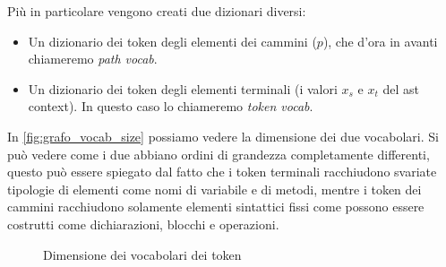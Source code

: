 Più in particolare vengono creati due dizionari diversi:
  \begin{itemize}
    \item Un dizionario dei token degli elementi dei cammini ($p$), che d'ora in avanti chiameremo \textit{path vocab}.
    \item Un dizionario dei token degli elementi terminali (i valori $x_s$ e $x_t$ del ast context). In questo caso lo chiameremo \textit{token vocab}.
  \end{itemize}
In \autoref{fig:grafo_vocab_size} possiamo vedere la dimensione dei due vocabolari.
Si può vedere come i due abbiano ordini di grandezza completamente differenti, questo può essere spiegato dal fatto che i token terminali racchiudono svariate tipologie di elementi come nomi di variabile e di metodi,
mentre i token dei cammini racchiudono solamente elementi sintattici fissi come possono essere costrutti come dichiarazioni, blocchi e operazioni.

  \begin{figure}
    \centering
    \caption{Dimensione dei vocabolari dei token}
    \label{fig:grafo_vocab_size}
\end{figure}








